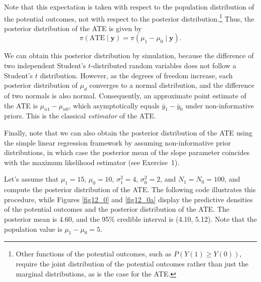 Note that this expectation is taken with respect to the population distribution of the potential outcomes, not with respect to the posterior distribution.\footnote{Other functions of the potential outcomes, such as $P(Y(1)\geq Y(0))$, require the joint distribution of the potential outcomes rather than just the marginal distributions, as is the case for the ATE.} Thus, the posterior distribution of the ATE is given by 
\[
\pi(\text{ATE}\mid \mathbf{y}) = \pi(\mu_{1} - \mu_{0}\mid \mathbf{y}).
\]

We can obtain this posterior distribution by simulation, because the difference of two independent Student's $t$-distributed random variables does not follow a Student's $t$ distribution. However, as the degrees of freedom increase, each posterior distribution of $\mu_{d}$ converges to a normal distribution, and the difference of two normals is also normal. Consequently, an approximate point estimate of the ATE is $\mu_{n1} - \mu_{n0}$, which asymptotically equals $\bar{y}_1 - \bar{y}_0$ under non-informative priors. This is the classical \textit{estimator} of the ATE.

Finally, note that we can also obtain the posterior distribution of the ATE using the simple linear regression framework by assuming non-informative prior distributions, in which case the posterior mean of the slope parameter coincides with the maximum likelihood estimator (see Exercise~1).

Let's assume that $\mu_1 = 15$, $\mu_0 = 10$, $\sigma_1^2 = 4$, $\sigma_0^2 = 2$, and $N_1=N_0=100$, and compute the posterior distribution of the ATE. The following code illustrates this procedure, while Figures \ref{fig12_0} and \ref{fig12_0a} display the predictive densities of the potential outcomes and the posterior distribution of the ATE. The posterior mean is 4.60, and the 95\% credible interval is (4.10, 5.12). Note that the population value is $\mu_1-\mu_0=5$.

